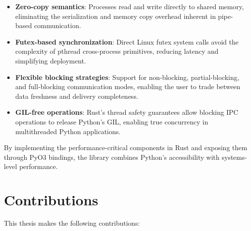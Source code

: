\begin{itemize}
    \item \textbf{Zero-copy semantics}: Processes read and write directly to shared memory, eliminating the serialization and memory copy overhead inherent in pipe-based communication.

    \item \textbf{Futex-based synchronization}: Direct Linux futex system calls avoid the complexity of pthread cross-process primitives, reducing latency and simplifying deployment.

    \item \textbf{Flexible blocking strategies}: Support for non-blocking, partial-blocking, and full-blocking communication modes, enabling the user to trade between data freshness and delivery completeness.

    \item \textbf{GIL-free operations}: Rust's thread safety guarantees allow blocking IPC operations to release Python's GIL, enabling true concurrency in multithreaded Python applications.
\end{itemize}

By implementing the performance-critical components in Rust and exposing them through PyO3 bindings, the library combines Python's accessibility with systems-level performance.

\section{Contributions}

This thesis makes the following contributions:

